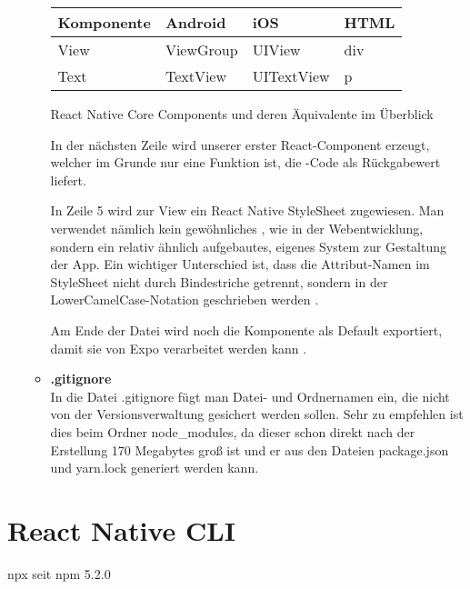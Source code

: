 \begin{itemize}
\begin{itemize}
\begin{table}[H]
\centering
\begin{tabular}{|l|l|l|l|}
  \hline
  \textbf{Komponente} & \textbf{Android} & \textbf{iOS} & \textbf{HTML} \\ \hline\hline
  View                & ViewGroup        & UIView       & div          \\
  Text                & TextView         & UITextView   & p            \\ \hline
\end{tabular}
\end{table}

\begin{center}
  React Native Core Components und deren Äquivalente im Überblick \cite{reactNativeCoreComponents}
\end{center}

In der nächsten Zeile wird unserer erster React-Component erzeugt, welcher im Grunde nur eine
Funktion ist, die -Code als Rückgabewert liefert.

In Zeile 5 wird zur View ein React Native StyleSheet zugewiesen. Man verwendet nämlich kein
gewöhnliches , wie in der Webentwicklung, sondern ein relativ ähnlich aufgebautes,
eigenes System zur Gestaltung der App. Ein wichtiger Unterschied ist, dass die Attribut-Namen im
StyleSheet nicht durch Bindestriche getrennt, sondern in der LowerCamelCase-Notation geschrieben
werden \cite{camelCaseNotation}.

Am Ende der Datei wird noch die Komponente als Default exportiert, damit sie von Expo verarbeitet
werden kann \cite{jsModules}.

    \item \textbf{.gitignore}\\
In die Datei .gitignore fügt man Datei- und Ordnernamen ein, die nicht von der Versionsverwaltung
gesichert werden sollen. Sehr zu empfehlen ist dies beim Ordner node\_modules, da dieser schon
direkt nach der Erstellung 170 Megabytes groß ist und er aus den Dateien package.json und yarn.lock
generiert werden kann.


\end{itemize}
\end{itemize}



\subsection{}

\section{React Native CLI}
npx seit npm 5.2.0